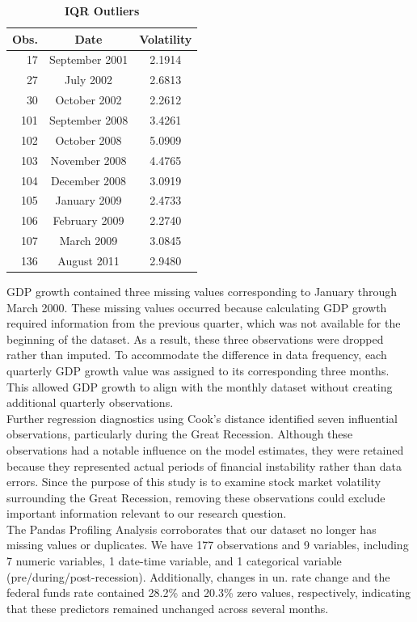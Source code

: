 \begin{table}[H]
\centering
\caption{\textbf{IQR Outliers}}
\label{tab:outliers}
\renewcommand{\arraystretch}{1.3}
\setlength{\tabcolsep}{16pt}
\begin{tabular}{rcc}
\toprule
Obs. & Date & Volatility \\
\midrule
17 & September 2001 & 2.1914 \\
27 & July 2002 & 2.6813 \\
30 & October 2002 & 2.2612 \\
101 & September 2008 & 3.4261 \\
102 & October 2008 & 5.0909 \\
103 & November 2008 & 4.4765 \\
104 & December 2008 & 3.0919 \\
105 & January 2009 & 2.4733 \\
106 & February 2009 & 2.2740 \\
107 & March 2009 & 3.0845 \\
136 & August 2011 & 2.9480 \\
\bottomrule
\end{tabular}
\end{table}
\indent GDP growth contained three missing values corresponding to January through March 2000. These missing values occurred because calculating GDP growth required information from the previous quarter, which was not available for the beginning of the dataset. As a result, these three observations were dropped rather than imputed. To accommodate the difference in data frequency, each quarterly GDP growth value was assigned to its corresponding three months. This allowed GDP growth to align with the monthly dataset without creating additional quarterly observations. \\
\indent Further regression diagnostics using Cook's distance identified seven influential observations, particularly during the Great Recession. Although these observations had a notable influence on the model estimates, they were retained because they represented actual periods of financial instability rather than data errors. Since the purpose of this study is to examine stock market volatility surrounding the Great Recession, removing these observations could exclude important information relevant to our research question. \\
\indent The Pandas Profiling Analysis corroborates that our dataset no longer has missing values or duplicates. We have 177 observations and 9 variables, including 7 numeric variables, 1 date-time variable, and 1 categorical variable (pre/during/post-recession). Additionally, changes in un. rate change and the federal funds rate contained 28.2\% and 20.3\% zero values, respectively, indicating that these predictors remained unchanged across several months.

